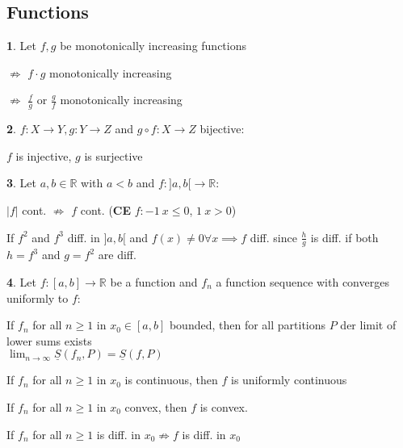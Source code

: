 \documentclass[a4paper, 10pt]{article}
\theoremstyle{definition}
\theoremstyle{ex}
\newtheorem*{exercise}{}
\theoremstyle{named}
\newcommand{\R}{\mathbb{R}}
\begin{document}
\subsection*{Functions}
\begin{exercise}
    Let $f, g$ be monotonically increasing functions
    \begin{exanswers}[leftmargin=7mm]
        \item[$\not\Rightarrow$] $f \cdot g$ monotonically increasing
        \item[$\not\Rightarrow$] $\frac{f}{g}$ or $\frac{g}{f}$ monotonically increasing
    \end{exanswers}
\end{exercise}

\begin{exercise}
    $f: X \to Y, g: Y \to Z$ and $g \circ f : X \to Z$ bijective:
    \begin{exanswers}
        \item $f$ is injective, $g$ is surjective
    \end{exanswers}
\end{exercise}

\begin{exercise}
    Let $a, b \in \R$ with $a < b$ and $f: ]a, b[ \to \R$:
    \begin{exanswers}
        \item $|f|$ cont. $\not\Rightarrow$ $f$ cont. (\textbf{CE} $f: -1 \ x \leq 0$, $1 \ x > 0$)
        \item If $f^2$ and $f^3$ diff. in $]a, b[$ and $f(x) \neq 0 \forall x \implies f$ diff. since $\frac{h}{g}$ is diff. if both $h = f^3$ and $g = f^2$ are diff.
    \end{exanswers}
\end{exercise}

\begin{exercise}
    Let $f: [a, b] \to \R$ be a function and $f_n$ a function sequence with converges uniformly to $f$:
    \begin{exanswers}
        \item If $f_n$ for all $n \geq 1$ in $x_0 \in [a, b]$ bounded, then for all partitions $P$ der limit of lower sums exists \\
        $\lim_{n\to\infty} \underline{S}(f_n, P) = \underline{S}(f, P)$
        \item If $f_n$ for all $n \geq 1$ in $x_0$ is continuous, then $f$ is uniformly continuous
        \item If $f_n$ for all $n \geq 1$ in $x_0$ convex, then $f$ is convex.
        \item If $f_n$ for all $n \geq 1$ is diff. in $x_0 \not\Rightarrow f$ is diff. in $x_0$
    \end{exanswers}
\end{exercise}
\end{document}
